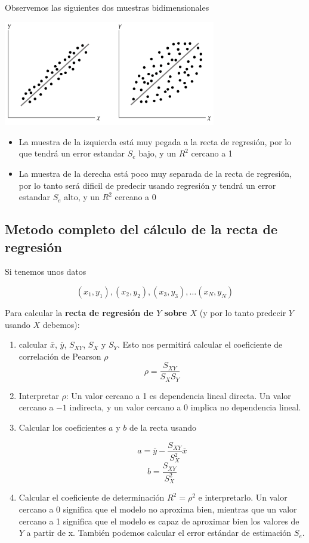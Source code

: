 \documentclass[]{book}
\providecommand{\tightlist}{%
  \setlength{\itemsep}{0pt}\setlength{\parskip}{0pt}}
\theoremstyle{plain}
\theoremstyle{definition}
\begin{document}
Observemos las siguientes dos muestras bidimensionales

\includegraphics[width=3.64583in,height=\textheight]{img/error_regression.png}

\begin{itemize}
\tightlist
\item
  La muestra de la izquierda está muy pegada a la recta de regresión,
  por lo que tendrá un error estandar \(S_e\) bajo, y un \(R^2\) cercano
  a 1
\item
  La muestra de la derecha está poco muy separada de la recta de
  regresión, por lo tanto será dificil de predecir usando regresión y
  tendrá un error estandar \(S_e\) alto, y un \(R^2\) cercano a 0
\end{itemize}

\hypertarget{metodo-completo-del-cuxe1lculo-de-la-recta-de-regresiuxf3n}{%
\subsection{Metodo completo del cálculo de la recta de
regresión}\label{metodo-completo-del-cuxe1lculo-de-la-recta-de-regresiuxf3n}}

Si tenemos unos datos

\[(x_1, y_1), (x_2, y_2), (x_3,y_3), \ldots (x_N,y_N)\]

Para calcular la \textbf{recta de regresión de \(Y\) sobre \(X\)} (y por
lo tanto predecir \(Y\) usando \(X\) debemos):

\begin{enumerate}
\def\labelenumi{\arabic{enumi}.}
\item
  calcular \(\overline x\), \(\overline y\), \(S_{XY}\), \(S_X\) y
  \(S_Y\). Esto nos permitirá calcular el coeficiente de correlación de
  Pearson \(\rho\) \[\rho = \frac{S_{XY}}{S_X S_Y}\]
\item
  Interpretar \(\rho\): Un valor cercano a 1 es dependencia lineal
  directa. Un valor cercano a \(-1\) indirecta, y un valor cercano a 0
  implica no dependencia lineal.
\item
  Calcular los coeficientes \(a\) y \(b\) de la recta usando

  \[a = \overline{y} - \frac{S_{XY}}{S^2_X} \overline x\]
  \[b = \frac{S_{XY}}{S^2_X}\]
\item
  Calcular el coeficiente de determinación \(R^2 = \rho^2\) e
  interpretarlo. Un valor cercano a 0 significa que el modelo no
  aproxima bien, mientras que un valor cercano a 1 significa que el
  modelo es capaz de aproximar bien los valores de \(Y\) a partir de x.
  También podemos calcular el error estándar de estimación \(S_e\).
\end{enumerate}
\end{document}
